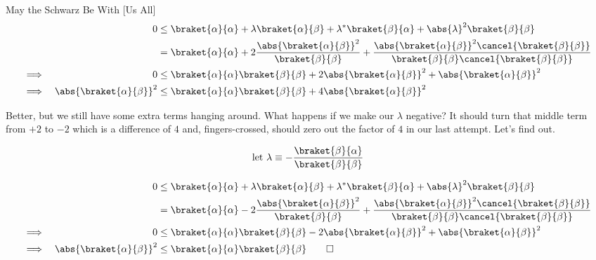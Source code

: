 \begin{answer}
\begin{answerpart}{May the Schwarz Be With [Us All]}
    \begin{equation}
      \begin{alignedat}{2}
        & &
        0
        &\le
        \braket{\alpha}{\alpha}
        + \lambda\braket{\alpha}{\beta}
        + \lambda^{*}\braket{\beta}{\alpha}
        + \abs{\lambda}^{2}\braket{\beta}{\beta}
        \\
        & & &=
        \braket{\alpha}{\alpha}
        + 2\frac{\abs{\braket{\alpha}{\beta}}^2}{\braket{\beta}{\beta}}
        + \frac{\abs{\braket{\alpha}{\beta}}^2\cancel{\braket{\beta}{\beta}}}{\braket{\beta}{\beta}\cancel{\braket{\beta}{\beta}}}
        \\
        \implies \quad & & 0 &\le
        \braket{\alpha}{\alpha}\braket{\beta}{\beta}
        + 2\abs{\braket{\alpha}{\beta}}^2
        + \abs{\braket{\alpha}{\beta}}^2
        \\
        \implies \quad & & \abs{\braket{\alpha}{\beta}}^2 &\le
        \braket{\alpha}{\alpha}\braket{\beta}{\beta}
        + 4\abs{\braket{\alpha}{\beta}}^2
        \\
      \end{alignedat}
    \end{equation}

    Better, but we still have some extra terms hanging around.  What
    happens if we make our $\lambda$ negative?  It should turn that
    middle term from $+2$ to $-2$ which is a difference of $4$ and,
    fingers-crossed, should zero out the factor of $4$ in our last
    attempt.  Let's find out.

    \begin{equation}
      \text{let } \lambda \equiv -\frac{\braket{\beta}{\alpha}}{\braket{\beta}{\beta}}
    \end{equation}

    \begin{equation}
      \begin{alignedat}{2}
        & &
        0
        &\le
        \braket{\alpha}{\alpha}
        + \lambda\braket{\alpha}{\beta}
        + \lambda^{*}\braket{\beta}{\alpha}
        + \abs{\lambda}^{2}\braket{\beta}{\beta}
        \\
        & & &=
        \braket{\alpha}{\alpha}
        - 2\frac{\abs{\braket{\alpha}{\beta}}^2}{\braket{\beta}{\beta}}
        + \frac{\abs{\braket{\alpha}{\beta}}^2\cancel{\braket{\beta}{\beta}}}{\braket{\beta}{\beta}\cancel{\braket{\beta}{\beta}}}
        \\
        \implies \quad & & 0 &\le
        \braket{\alpha}{\alpha}\braket{\beta}{\beta}
        - 2\abs{\braket{\alpha}{\beta}}^2
        + \abs{\braket{\alpha}{\beta}}^2
        \\
        \implies \quad & & \abs{\braket{\alpha}{\beta}}^2 &\le
        \braket{\alpha}{\alpha}\braket{\beta}{\beta}
        \qed
        \\
      \end{alignedat}
    \end{equation}


\end{answerpart}
\end{answer}
